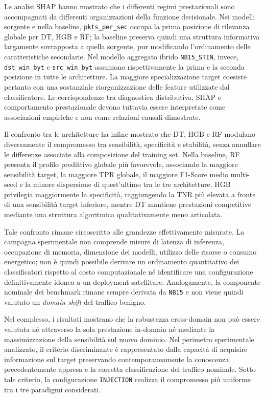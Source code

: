 Le analisi SHAP hanno mostrato che i differenti regimi prestazionali sono accompagnati da differenti organizzazioni della funzione decisionale. 
Nei modelli sorgente e nella baseline, \texttt{pkts\_per\_sec} occupa la prima posizione di rilevanza globale per DT, HGB e RF; la baseline preserva quindi una struttura informativa largamente sovrapposta a quella sorgente, pur modificando l'ordinamento delle caratteristiche secondarie. 
Nel modello aggregato ibrido \texttt{NB15\_STIN}, invece, \texttt{dst\_win\_byt} e \texttt{src\_win\_byt} assumono rispettivamente la prima e la seconda posizione in tutte le architetture. 
La maggiore specializzazione target coesiste pertanto con una sostanziale riorganizzazione delle feature utilizzate dal classificatore. 
Le corrispondenze tra diagnostica distributiva, SHAP e comportamento prestazionale devono tuttavia essere interpretate come associazioni empiriche e non come relazioni causali dimostrate.

Il confronto tra le architetture ha infine mostrato che DT, HGB e RF modulano diversamente il compromesso tra sensibilità, specificità e stabilità, senza annullare le differenze associate alla composizione del training set.
Nella baseline, RF presenta il profilo predittivo globale più favorevole, associando la maggiore sensibilità target, la maggiore TPR globale, il maggiore F1-Score medio multi-seed e la minore dispersione di quest'ultimo tra le tre architetture. 
HGB privilegia maggiormente la specificità, raggiungendo la TNR più elevata a fronte di una sensibilità target inferiore, mentre DT mantiene prestazioni competitive mediante una struttura algoritmica qualitativamente meno articolata.

Tale confronto rimane circoscritto alle grandezze effettivamente misurate.
La campagna sperimentale non comprende misure di latenza di inferenza, occupazione di memoria, dimensione dei modelli, utilizzo delle risorse o consumo energetico; non è quindi possibile derivare un ordinamento quantitativo dei classificatori rispetto al costo computazionale né identificare una configurazione definitivamente idonea a un deployment satellitare. 
Analogamente, la componente nominale dei benchmark rimane sempre derivata da \texttt{NB15} e non viene quindi valutato un \textit{domain shift} del traffico benigno.

Nel complesso, i risultati mostrano che la robustezza cross-domain non può essere valutata né attraverso la sola prestazione in-domain né mediante la massimizzazione della sensibilità sul nuovo dominio. 
Nel perimetro sperimentale analizzato, il criterio discriminante è rappresentato dalla capacità di acquisire informazione sul target preservando contemporaneamente la conoscenza precedentemente appresa e la corretta classificazione del traffico nominale. 
Sotto tale criterio, la configurazione \texttt{INJECTION} realizza il compromesso più uniforme tra i tre paradigmi considerati.

